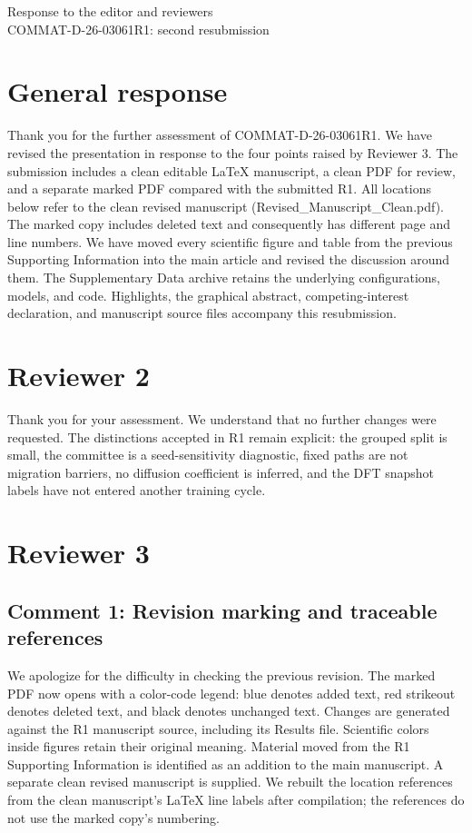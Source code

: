 \documentclass[11pt]{article}
\begin{document}
\begin{center}\Large Response to the editor and reviewers\\
\normalsize COMMAT-D-26-03061R1: second resubmission\end{center}
\section*{General response}
Thank you for the further assessment of COMMAT-D-26-03061R1. We have revised the presentation in response to the four points raised by Reviewer 3. The submission includes a clean editable LaTeX manuscript, a clean PDF for review, and a separate marked PDF compared with the submitted R1. All locations below refer to the clean revised manuscript (Revised\_Manuscript\_Clean.pdf). The marked copy includes deleted text and consequently has different page and line numbers. We have moved every scientific figure and table from the previous Supporting Information into the main article and revised the discussion around them. The Supplementary Data archive retains the underlying configurations, models, and code. Highlights, the graphical abstract, competing-interest declaration, and manuscript source files accompany this resubmission.
\section*{Reviewer 2}
Thank you for your assessment. We understand that no further changes were requested. The distinctions accepted in R1 remain explicit: the grouped split is small, the committee is a seed-sensitivity diagnostic, fixed paths are not migration barriers, no diffusion coefficient is inferred, and the DFT snapshot labels have not entered another training cycle.
\section*{Reviewer 3}
\subsection*{Comment 1: Revision marking and traceable references}
We apologize for the difficulty in checking the previous revision. The marked PDF now opens with a color-code legend: blue denotes added text, red strikeout denotes deleted text, and black denotes unchanged text. Changes are generated against the R1 manuscript source, including its Results file. Scientific colors inside figures retain their original meaning. Material moved from the R1 Supporting Information is identified as an addition to the main manuscript. A separate clean revised manuscript is supplied. We rebuilt the location references from the clean manuscript's LaTeX line labels after compilation; the references do not use the marked copy's numbering.
\end{document}

